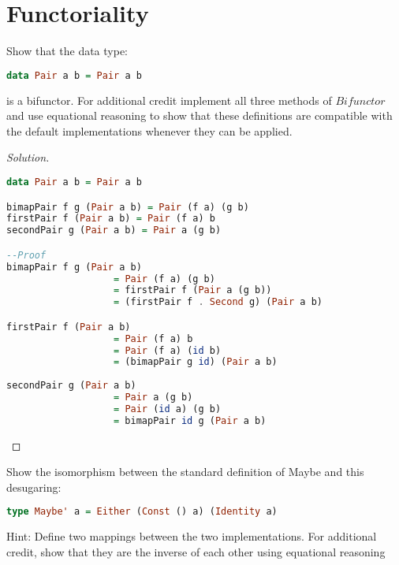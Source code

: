 \documentclass[7x10,thmnumcontwithchapter,WebLink,AddlevelTwoTOC,NumRef,BookEndNote,printer]{pupbook}
\begin{document}
\chapter[Functoriality]{Functoriality\thefootnote}

\begin{exercise}
Show that the data type:
\begin{lstlisting}[language=Haskell]
data Pair a b = Pair a b
\end{lstlisting}
is a bifunctor. For additional credit implement all three methods of $Bifunctor$ and use equational reasoning to show that
these definitions are compatible with the default implementations whenever they can be applied.
\end{exercise}

\begin{proof}[Solution]
~\\
\begin{lstlisting}[language=Haskell]
data Pair a b = Pair a b

bimapPair f g (Pair a b) = Pair (f a) (g b)
firstPair f (Pair a b) = Pair (f a) b
secondPair g (Pair a b) = Pair a (g b)

--Proof
bimapPair f g (Pair a b) 
                   = Pair (f a) (g b)
                   = firstPair f (Pair a (g b))
                   = (firstPair f . Second g) (Pair a b) 

firstPair f (Pair a b) 
                   = Pair (f a) b 
                   = Pair (f a) (id b) 
                   = (bimapPair g id) (Pair a b) 
                   
secondPair g (Pair a b) 
                   = Pair a (g b)
                   = Pair (id a) (g b)
                   = bimapPair id g (Pair a b)
\end{lstlisting}

\end{proof}


\begin{exercise}
Show the isomorphism between the standard definition of Maybe
and this desugaring:
\begin{lstlisting}[language=Haskell]
type Maybe' a = Either (Const () a) (Identity a)
\end{lstlisting}
Hint: Define two mappings between the two implementations. For additional credit, show that they are the inverse of each other using equational reasoning
\end{exercise}
\end{document}
